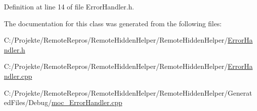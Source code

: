 Definition at line 14 of file Error\+Handler.\+h.



The documentation for this class was generated from the following files\+:\begin{DoxyCompactItemize}
\item 
C\+:/\+Projekte/\+Remote\+Repros/\+Remote\+Hidden\+Helper/\+Remote\+Hidden\+Helper/\hyperlink{_error_handler_8h}{Error\+Handler.\+h}\item 
C\+:/\+Projekte/\+Remote\+Repros/\+Remote\+Hidden\+Helper/\+Remote\+Hidden\+Helper/\hyperlink{_error_handler_8cpp}{Error\+Handler.\+cpp}\item 
C\+:/\+Projekte/\+Remote\+Repros/\+Remote\+Hidden\+Helper/\+Remote\+Hidden\+Helper/\+Generated\+Files/\+Debug/\hyperlink{moc___error_handler_8cpp}{moc\+\_\+\+Error\+Handler.\+cpp}\end{DoxyCompactItemize}
